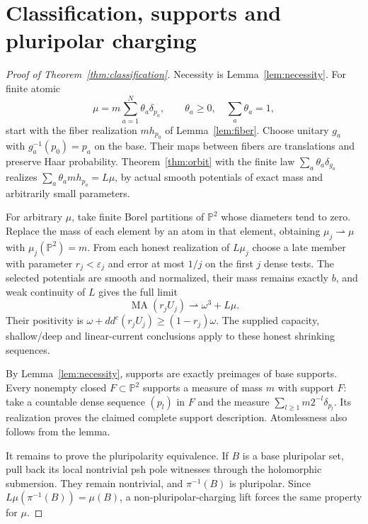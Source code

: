 \documentclass[11pt]{article}
\newcommand{\ddc}{dd^c}
\newcommand{\MA}{\operatorname{MA}}
\begin{document}
\section{Classification, supports and pluripolar charging}
\begin{proof}[Proof of Theorem~\ref{thm:classification}]
Necessity is Lemma~\ref{lem:necessity}. For finite atomic
\[
 \mu=m\sum_{a=1}^N\theta_a\delta_{p_a},\qquad
 \theta_a\geq0,\quad\sum_a\theta_a=1,
\]
start with the fiber realization $mh_{p_0}$ of Lemma~\ref{lem:fiber}.
Choose unitary $g_a$ with $g_a^{-1}(p_0)=p_a$ on the base.
Their maps between fibers are translations and preserve Haar
probability. Theorem~\ref{thm:orbit} with the finite law
$\sum_a\theta_a\delta_{g_a}$ realizes
$\sum_a\theta_amh_{p_a}=L\mu$, by actual smooth potentials of
exact mass and arbitrarily small parameters.

For arbitrary $\mu$, take finite Borel partitions of $\mathbb P^2$
whose diameters tend to zero. Replace the mass of each element by
an atom in that element, obtaining $\mu_j\rightharpoonup\mu$ with
$\mu_j(\mathbb P^2)=m$. From each honest realization of $L\mu_j$
choose a late member with parameter $r_j<\varepsilon_j$ and error
at most $1/j$ on the first $j$ dense tests. The selected potentials
are smooth and normalized, their mass remains exactly $b$, and weak
continuity of $L$ gives the full limit
\[
 \MA(r_jU_j)\rightharpoonup\omega^3+L\mu.
\]
Their positivity is $\omega+\ddc(r_jU_j)\geq(1-r_j)\omega$.
The supplied capacity, shallow/deep and linear-current conclusions
apply to these honest shrinking sequences.

By Lemma~\ref{lem:necessity}, supports are exactly preimages of base
supports. Every nonempty closed $F\subset\mathbb P^2$ supports a
measure of mass $m$ with support $F$: take a countable dense sequence
$(p_l)$ in $F$ and the measure $\sum_{l\geq1}m2^{-l}\delta_{p_l}$.
Its realization proves the claimed complete support description.
Atomlessness also follows from the lemma.

It remains to prove the pluripolarity equivalence. If $B$ is a base
pluripolar set, pull back its local nontrivial psh pole witnesses
through the holomorphic submersion. They remain nontrivial, and
$\pi^{-1}(B)$ is pluripolar. Since
$L\mu(\pi^{-1}(B))=\mu(B)$, a non-pluripolar-charging lift forces
the same property for $\mu$.


\end{proof}
\end{document}
